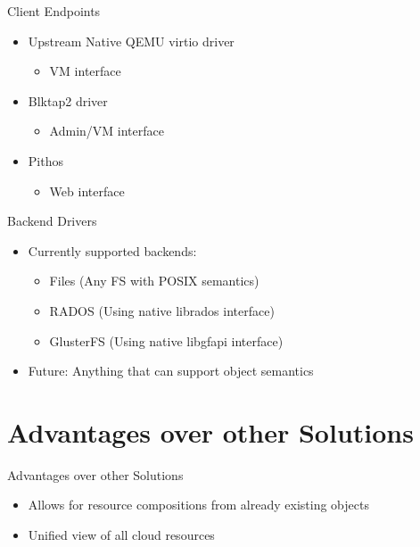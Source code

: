 \documentclass[utf8]{beamer}
\begin{document}
\begin{frame}{Client Endpoints}
  \begin{itemize}
  \item Upstream Native QEMU virtio driver
    \begin{itemize}
    \item VM interface
    \end{itemize}
  \item Blktap2 driver
    \begin{itemize}
    \item Admin/VM interface
    \end{itemize}
  \item Pithos
    \begin{itemize}
    \item Web interface
    \end{itemize}
  \end{itemize}
\end{frame}

\begin{frame}{Backend Drivers}
  \begin{itemize}
    \item Currently supported backends:
      \begin{itemize}
      \item Files (Any FS with POSIX semantics)
      \item RADOS (Using native librados interface)
      \item GlusterFS (Using native libgfapi interface)
      \end{itemize}
    \item Future: Anything that can support object semantics
  \end{itemize}
\end{frame}

\section{Advantages over other Solutions}

\begin{frame}{Advantages over other Solutions}
\begin{itemize}
  \item Allows for resource compositions from already existing objects
  \item Unified view of all cloud resources
\end{itemize}
\end{frame}
\end{document}
